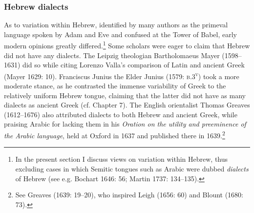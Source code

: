 \subsubsection{Hebrew dialects}
\hypertarget{Toc19704866}{}\begin{styleStandard}
As to variation within Hebrew, identified by many authors as the primeval language spoken by Adam and Eve and confused at the Tower of Babel, early modern opinions greatly differed.\footnote{ In the present section I discuss views on variation within Hebrew, thus excluding cases in which Semitic tongues such as Arabic were dubbed \textit{dialects} of Hebrew (see e.g. Bochart 1646: 56; Martin 1737: 134–135).} Some scholars were eager to claim that Hebrew did not have any dialects. The Leipzig theologian Bartholomaeus Mayer (1598–1631) did so while citing Lorenzo Valla’s comparison of Latin and ancient Greek (Mayer 1629: 10). Franciscus Junius the Elder Junius (1579: \textsc{b.3}\textsc{\textsuperscript{v}}) took a more moderate stance, as he contrasted the immense variability of Greek to the relatively uniform Hebrew tongue, claiming that the latter did not have as many dialects as ancient Greek (cf. Chapter 7). The English orientalist Thomas Greaves (1612–1676) also attributed dialects to both Hebrew and ancient Greek, while praising Arabic for lacking them in his \textit{Oration on the utility and preeminence of the Arabic language}, held at Oxford in 1637 and published there in 1639.\footnote{ See Greaves (1639: 19–20), who inspired Leigh (1656: 60) and Blount (1680: 73).}
\end{styleStandard}


